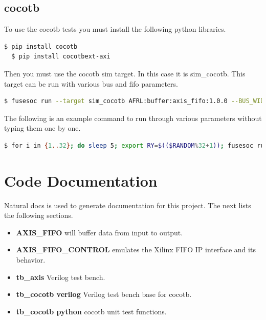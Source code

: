 \subsection{cocotb}
\par
To use the cocotb tests you must install the following python libraries.
\begin{lstlisting}[language=bash]
  $ pip install cocotb
  $ pip install cocotbext-axi
\end{lstlisting}

Then you must use the cocotb sim target. In this case it is sim\_cocotb. This target can be run with various bus and fifo parameters.
\begin{lstlisting}[language=bash]
  $ fusesoc run --target sim_cocotb AFRL:buffer:axis_fifo:1.0.0 --BUS_WIDTH=8 --FIFO_DEPTH=32
\end{lstlisting}

The following is an example command to run through various parameters without typing them one by one.
\begin{lstlisting}[language=bash]
  $ for i in {1..32}; do sleep 5; export RY=$(($RANDOM%32+1)); fusesoc run --target sim_cocotb AFRL:buffer:axis_fifo:1.0.0 --BUS_WIDTH=$i --FIFO_DEPTH=$RY; echo "BUS WIDTH:" $i "FIFO DEPTH:" $RY; done
\end{lstlisting}
\newpage

\section{Code Documentation} \label{Code Documentation}

\par
Natural docs is used to generate documentation for this project. The next lists the following sections.

\begin{itemize}
\item \textbf{AXIS\_FIFO} will buffer data from input to output.\\
\item \textbf{AXIS\_FIFO\_CONTROL} emulates the Xilinx FIFO IP interface and its behavior.\\
\item \textbf{tb\_axis} Verilog test bench.\\
\item \textbf{tb\_cocotb verilog} Verilog test bench base for cocotb.\\
\item \textbf{tb\_cocotb python} cocotb unit test functions.\\
\end{itemize}

